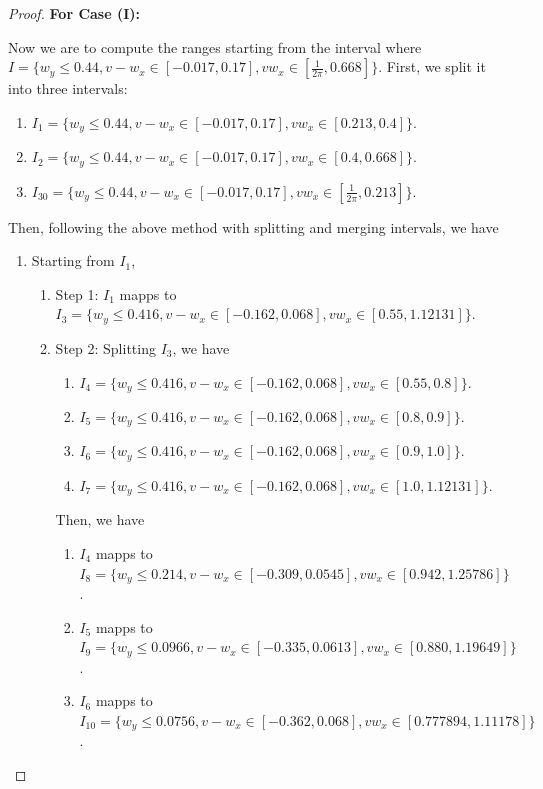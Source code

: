 \documentclass{article}
\theoremstyle{plain}
\theoremstyle{remark}
\begin{document}
\begin{proof}
\textbf{For Case (I):}

Now we are to compute the ranges starting from the interval where $I=\{w_y\le 0.44, v-w_x\in[-0.017, 0.17], vw_x \in[\frac{1}{2\pi}, 0.668]\}$. First, we split it into three intervals:
\begin{enumerate}
    \item $I_1 = \{w_y\le 0.44, v-w_x\in[-0.017, 0.17], vw_x \in[0.213, 0.4]\}$.
    \item $I_2 = \{w_y\le 0.44, v-w_x\in[-0.017, 0.17], vw_x \in[0.4, 0.668]\}$.
    \item $I_{30} = \{w_y\le 0.44, v-w_x\in[-0.017, 0.17], vw_x \in[\frac{1}{2\pi}, 0.213]\}$.
\end{enumerate}

Then, following the above method with splitting and merging intervals, we have
\begin{enumerate}
    \item Starting from $I_1$,
    \begin{enumerate}
        \item Step 1: $I_1$ mapps to $I_3=\{w_y\le 0.416, v-w_x\in[-0.162, 0.068], vw_x \in[0.55, 1.12131]\}$.
        \item Step 2: Splitting $I_3$, we have
            \begin{enumerate}
                \item $I_4 = \{w_y\le 0.416, v-w_x\in[-0.162, 0.068], vw_x \in[0.55, 0.8]\}$.
                \item $I_5 = \{w_y\le 0.416, v-w_x\in[-0.162, 0.068], vw_x \in[0.8, 0.9]\}$.
                \item $I_6 = \{w_y\le 0.416, v-w_x\in[-0.162, 0.068], vw_x \in[0.9, 1.0]\}$.
                \item $I_7 = \{w_y\le 0.416, v-w_x\in[-0.162, 0.068], vw_x \in[1.0, 1.12131]\}$.
            \end{enumerate}
            Then, we have
            \begin{enumerate}
                \item $I_4$ mapps to \\ $I_8 = \{w_y\le 0.214, v-w_x\in[-0.309, 0.0545], vw_x \in[0.942, 1.25786]\}$.
                \item $I_5$ mapps to \\ $I_9 = \{w_y\le 0.0966, v-w_x\in[-0.335, 0.0613], vw_x \in[0.880, 1.19649]\}$.
                \item $I_6$ mapps to \\ $I_{10} = \{w_y\le 0.0756, v-w_x\in[-0.362, 0.068], vw_x \in[0.777894, 1.11178]\}$.

\end{enumerate}
\end{enumerate}
\end{enumerate}
\end{proof}
\end{document}
